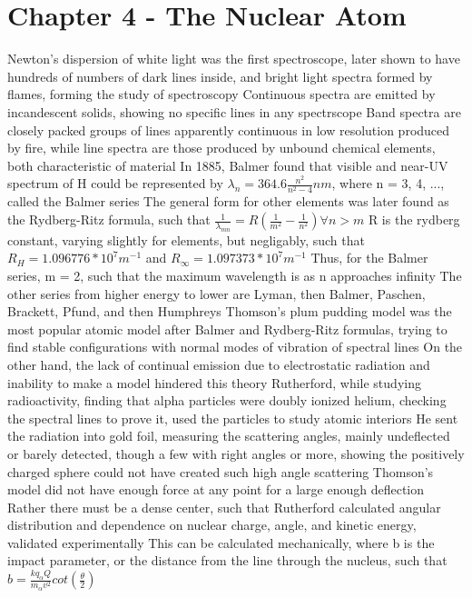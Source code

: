 \documentclass[11 pt, twoside]{article}
\newenvironment{outline*}
{
	\begin{outline}[enumerate]
	}
	{\end{outline}
}
\begin{document}
\section{Chapter 4 - The Nuclear Atom}
\begin{outline*}
\1 Newton's dispersion of white light was the first spectroscope, later shown to have hundreds of numbers of dark lines inside, and bright light spectra formed by flames, forming the study of spectroscopy
	\2 Continuous spectra are emitted by incandescent solids, showing no specific lines in any spectrscope
	\2 Band spectra are closely packed groups of lines apparently continuous in low resolution produced by fire, while line spectra are those produced by unbound chemical elements, both characteristic of material
\1 In 1885, Balmer found that visible and near-UV spectrum of H could be represented by $\lambda_n = 364.6 \frac{n^2}{n^2 - 4} nm$, where n = 3, 4, ..., called the Balmer series
	\2 The general form for other elements was later found as the Rydberg-Ritz formula, such that $\frac{1}{\lambda_{mn}} = R(\frac{1}{m^2} - \frac{1}{n^2}) \forall n > m$
		\3 R is the rydberg constant, varying slightly for elements, but negligably, such that $R_H = 1.096776 * 10^7 m^{-1}$ and $R_{\infty} = 1.097373 * 10^7 m^{-1}$
		\3 Thus, for the Balmer series, m = 2, such that the maximum wavelength is as n approaches infinity
	\2 The other series from higher energy to lower are Lyman, then Balmer, Paschen, Brackett, Pfund, and then Humphreys
\1 Thomson's plum pudding model was the most popular atomic model after Balmer and Rydberg-Ritz formulas, trying to find stable configurations with normal modes of vibration of spectral lines
	\2 On the other hand, the lack of continual emission due to electrostatic radiation and inability to make a model hindered this theory
\1 Rutherford, while studying radioactivity, finding that alpha particles were doubly ionized helium, checking the spectral lines to prove it, used the particles to study atomic interiors
	\2 He sent the radiation into gold foil, measuring the scattering angles, mainly undeflected or barely detected, though a few with right angles or more, showing the positively charged sphere could not have created such high angle scattering
		\3 Thomson's model did not have enough force at any point for a large enough deflection
	\2 Rather there must be a dense center, such that Rutherford calculated angular distribution and dependence on nuclear charge, angle, and kinetic energy, validated experimentally
	\2 This can be calculated mechanically, where b is the impact parameter, or the distance from the line through the nucleus, such that $b = \frac{kq_{\alpha}Q}{m_{\alpha}v^2}cot(\frac{\theta}{2})$

\end{outline*}
\end{document}
